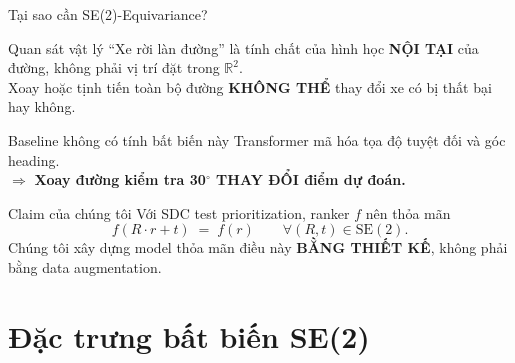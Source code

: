 \documentclass[aspectratio=169,10pt]{beamer}
\begin{document}
\begin{frame}{Tại sao cần SE(2)-Equivariance?}
\begin{block}{Quan sát vật lý}
\scriptsize
``Xe rời làn đường'' là tính chất của hình học \textbf{NỘI TẠI} của đường, không phải vị trí đặt trong $\mathbb{R}^2$. \\[3pt]
Xoay hoặc tịnh tiến toàn bộ đường \textbf{KHÔNG THỂ} thay đổi xe có bị thất bại hay không.
\end{block}

\begin{exampleblock}{Baseline không có tính bất biến này}
\scriptsize
Transformer mã hóa tọa độ tuyệt đối và góc heading.\\
$\Rightarrow$ \textbf{Xoay đường kiểm tra 30$^\circ$ THAY ĐỔI điểm dự đoán.}
\end{exampleblock}

\begin{block}{Claim của chúng tôi}
\scriptsize
Với SDC test prioritization, ranker $f$ nên thỏa mãn
\[
  f(R \cdot r + t) \;=\; f(r) \qquad \forall (R, t) \in \mathrm{SE}(2).
\]
Chúng tôi xây dựng model thỏa mãn điều này \textbf{BẰNG THIẾT KẾ}, không phải bằng data augmentation.
\end{block}
\end{frame}

\section{Đặc trưng bất biến SE(2)}
\end{document}
